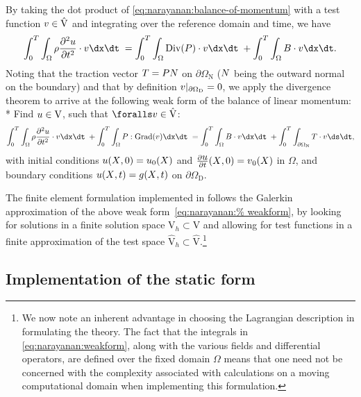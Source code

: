 By taking the dot product of \eqref{eq:narayanan:balance-of-momentum}
with a test function $\mbox{$ v$} \in \hat{\mathrm{V}}$ and integrating over
the reference domain and time, we have
\begin{equation}
  \int_{0}^{T} \int_{\Omega} \rho \frac{\partial^{2}
    \bu}{\partial t^{2}} \cdot \bv \dx \dt\;
  = \int_{0}^{T}\int_{\Omega} \mathrm{Div}(\bP) \cdot \bv \dx \dt\;
  + \int_{0}^{T} \int_{\Omega} \bB \cdot \bv \dx \dt.
\end{equation}
Noting that the traction vector $\mbox{$ T$} = \mbox{$ P$} \mbox{$ N$}$ on
$\partial\Omega_{\mathrm{N}}$ ($\mbox{$ N$}$ being the outward normal on the
boundary) and that by definition $\mbox{$ v$}|_{\partial\Omega_{\mathrm{D}}} =
0$, we apply the divergence theorem to arrive at the following weak
form of the balance of linear momentum: \\*
Find $\mbox{$ u$} \in \mathrm{V}$, such that $\foralls \bv \in
\hat{\mathrm{V}}$:
\begin{equation}
  \int_{0}^{T} \int_{\Omega} \rho \frac{\partial^{2} \bu}{\partial
    t^{2}} \cdot \bv \dx \dt\; + \int_{0}^{T} \int_{\Omega}
  \bP:\mathrm{Grad}(\bv) \dx \dt\; = \int_{0}^{T} \int_{\Omega} \bB
  \cdot \bv \dx \dt\; + \int_{0}^{T} \int_{\partial\Omega_{\mathrm{N}}}
  \bT \cdot \bv \ds \dt,
\label{eq:narayanan:weakform}
\end{equation}
with initial conditions $\mbox{$ u$}(\mbox{$ X$}, 0) = \mbox{$ u$}_{0}(\mbox{$ X$})$ and
$\frac{\partial\mbox{$ u$}}{\partial t}(\mbox{$ X$}, 0) = \mbox{$ v$}_{0}(\mbox{$ X$})$ in $\Omega$,
and boundary conditions $\mbox{$ u$}(\mbox{$ X$}, t) = \mbox{$ g$}(\mbox{$ X$}, t)$ on
$\partial\Omega_{\mathrm{D}}$.

The finite element formulation implemented in \twist{} follows the
Galerkin approximation of the above weak form~\eqref{eq:narayanan:%
weakform}, by looking for solutions in a finite solution space
$\mathrm{V}_{h} \subset \mathrm{V}$ and allowing for test functions in
a finite approximation of the test space $\hat{\mathrm{V}}_{h} \subset
\hat{\mathrm{V}}$.\footnote{We now note an inherent advantage in
  choosing the Lagrangian description in formulating the theory. The
  fact that the integrals in \eqref{eq:narayanan:weakform}, along with
  the various fields and differential operators, are defined over the
  fixed domain $\Omega$ means that one need not be concerned with the
  complexity associated with calculations on a moving computational
  domain when implementing this formulation.}

\subsection{Implementation of the static form}

